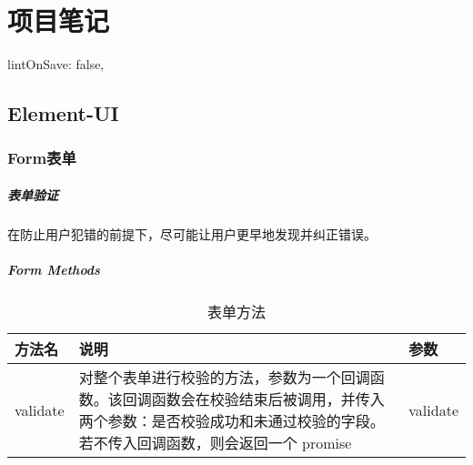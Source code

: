 \chapter{项目笔记}
\begin{js}
    lintOnSave: false,
\end{js}
\section{Element-UI}
\subsection{Form表单}
\paragraph{表单验证}
在防止用户犯错的前提下，尽可能让用户更早地发现并纠正错误。
\paragraph{Form Methods}
\begin{table}[H]
    \centering
    \caption{表单方法}
    \label{formmethods}
    \begin{tabularx}{\textwidth}{lXl}
        \hline
        方法名      & 说明                                                                                     & 参数       \\
        \hline
        validate & 对整个表单进行校验的方法，参数为一个回调函数。该回调函数会在校验结束后被调用，并传入两个参数：是否校验成功和未通过校验的字段。若不传入回调函数，则会返回一个 promise & validate \\
        \hline
    \end{tabularx}

\end{table}